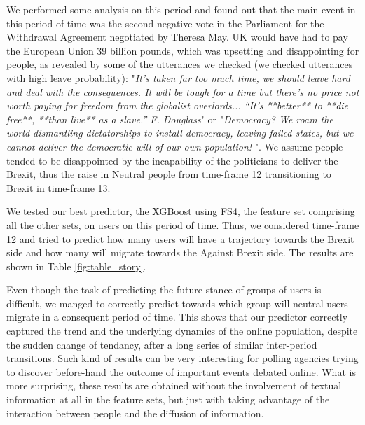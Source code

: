 We performed some analysis on this period and found out that the main event in this period of time was the second negative vote in the Parliament for the Withdrawal Agreement negotiated by Theresa May. UK would have had to pay the European Union 39 billion pounds, which was upsetting and disappointing for people, as revealed by some of the utterances we checked (we checked utterances with high leave probability): "\textit{It's taken far too much time, we should leave hard and deal with the consequences. It will be tough for a time but there's no price not worth paying for freedom from the globalist overlords... ``It's **better** to **die free**, **than live** as a slave.'' F. Douglass}" or "\textit{Democracy? We roam the world dismantling dictatorships to install democracy, leaving failed states, but we cannot deliver the democratic will of our own population! }". We assume people tended to be disappointed by the incapability of the politicians to deliver the Brexit, thus the raise in Neutral people from time-frame 12 transitioning to Brexit in time-frame 13. 


We tested our best predictor, the XGBoost using FS4, the feature set comprising all the other sets, on users on this period of time. Thus, we considered time-frame 12 and tried to predict how many users will have a trajectory towards the Brexit side and how many will migrate towards the Against Brexit side. The results are shown in Table \ref{fig:table_story}.



 Even though the task of predicting the future stance of groups of users is difficult, we manged to correctly predict towards which group will neutral users migrate in a consequent period of time. This shows that our predictor correctly captured the trend and the underlying dynamics of the online population, despite the sudden change of tendancy, after a long series of similar inter-period transitions. Such kind of results can be very interesting for polling agencies trying to discover before-hand the outcome of important events debated online. What is more surprising, these results are obtained without the involvement of textual information at all in the feature sets, but just with taking advantage of the interaction between people and the diffusion of information.